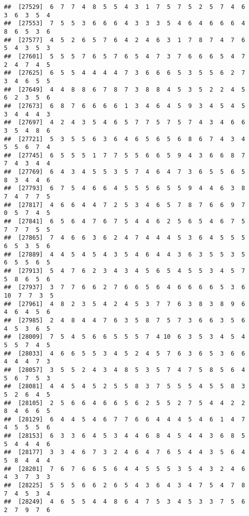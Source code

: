 \documentclass[
]{book}
\begin{document}
\begin{verbatim}
##  [27529]  6  7  7  4  8  5  5  4  3  1  7  5  7  5  2  5  7  4  6  3  6  3  5  4
##  [27553]  7  5  5  3  6  6  6  4  3  3  3  5  4  6  4  6  6  6  4  8  6  5  3  6
##  [27577]  4  5  2  6  5  7  6  4  2  4  6  3  1  7  8  7  4  7  6  5  4  3  5  3
##  [27601]  5  5  5  7  6  5  7  6  5  4  7  3  7  6  6  6  5  4  7  2  4  7  4  5
##  [27625]  6  5  5  4  4  4  4  7  3  6  6  6  5  3  5  5  6  2  7  3  4  6  5  5
##  [27649]  4  4  8  8  6  7  8  7  3  8  8  4  5  3  5  2  2  4  5  6  2  3  5  6
##  [27673]  6  8  7  6  6  6  6  1  3  4  6  4  5  9  3  4  5  4  5  3  4  4  4  3
##  [27697]  4  2  4  3  5  4  6  5  7  7  5  7  5  7  4  3  4  6  6  3  5  4  8  6
##  [27721]  5  3  5  5  6  3  6  4  6  5  6  5  6  8  6  7  4  3  4  5  5  6  7  4
##  [27745]  6  5  5  5  1  7  7  5  5  6  6  5  9  4  3  6  6  8  7  7  4  3  4  4
##  [27769]  6  4  3  4  5  5  3  5  7  4  6  4  7  3  6  5  5  6  5  8  3  4  4  6
##  [27793]  6  7  5  4  6  6  4  5  5  5  6  5  5  9  4  4  6  3  8  7  4  7  7  5
##  [27817]  4  6  6  4  4  7  2  5  3  4  6  5  7  8  7  6  6  9  7  0  5  7  4  5
##  [27841]  6  5  6  4  7  6  7  5  4  4  6  2  5  6  5  4  6  7  5  7  7  7  5  5
##  [27865]  7  4  6  6  3  6  2  4  7  4  4  4  5  3  6  4  5  5  5  6  5  3  5  6
##  [27889]  4  4  5  4  5  4  3  5  4  6  4  4  3  6  3  5  5  3  5  6  5  5  6  5
##  [27913]  5  4  7  6  2  3  4  3  4  5  6  5  4  5  5  3  4  5  7  5  8  6  5  6
##  [27937]  3  7  7  6  6  2  7  6  6  5  6  4  6  6  6  6  5  3  6 10  7  7  3  5
##  [27961]  4  8  2  3  5  4  2  4  5  3  7  7  6  3  8  3  8  9  6  4  6  4  5  6
##  [27985]  2  4  8  4  4  7  6  3  5  8  7  5  7  3  6  6  3  5  6  4  5  3  6  5
##  [28009]  7  5  4  5  6  6  5  5  5  7  4 10  6  3  5  3  4  5  4  5  5  7  4  5
##  [28033]  4  6  6  5  5  3  4  5  2  4  5  7  6  3  6  5  3  6  6  4  4  4  7  3
##  [28057]  3  5  5  2  4  3  4  8  5  3  5  7  4  7  5  8  5  6  4  5  6  7  5  3
##  [28081]  4  4  5  4  5  2  5  5  8  3  7  5  5  5  4  5  5  8  3  5  2  6  4  5
##  [28105]  2  5  6  6  4  6  6  5  6  2  5  5  2  7  5  4  4  2  2  8  4  6  6  5
##  [28129]  6  4  4  5  4  6  7  7  6  6  4  4  4  5  4  6  1  4  7  4  5  5  5  6
##  [28153]  6  3  3  6  4  5  3  4  4  6  8  4  5  4  4  3  6  8  5  5  4  4  4  6
##  [28177]  3  3  4  6  7  3  2  4  6  4  7  6  5  4  4  3  5  6  4  5  8  4  4  4
##  [28201]  7  6  7  6  6  5  6  4  4  5  5  5  3  5  4  3  2  4  6  4  3  7  3  3
##  [28225]  5  5  5  6  6  2  6  5  4  3  6  4  3  4  7  5  4  7  8  7  4  5  3  4
##  [28249]  4  6  5  5  4  4  8  6  4  7  5  3  4  5  3  3  7  5  6  2  7  9  7  6

\end{verbatim}
\end{document}
